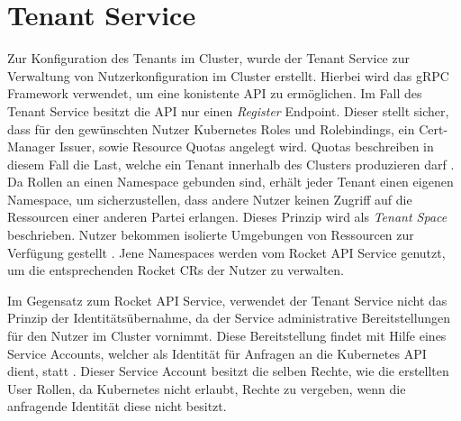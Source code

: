 \section{Tenant Service}
\label{sec:komponenten:tenant-service}
Zur Konfiguration des Tenants im Cluster, wurde der Tenant Service zur Verwaltung von Nutzerkonfiguration im Cluster erstellt.
Hierbei wird das gRPC Framework verwendet, um eine konistente API zu ermöglichen. Im Fall des Tenant Service
besitzt die API nur einen \emph{Register} Endpoint. Dieser stellt sicher, dass für den gewünschten Nutzer 
Kubernetes Roles und Rolebindings, ein Cert-Manager Issuer, sowie Resource Quotas angelegt wird. 
Quotas beschreiben in diesem Fall die Last, welche ein Tenant innerhalb des Clusters produzieren darf \cite{Krebs2012}.
Da Rollen an einen Namespace gebunden sind, erhält jeder Tenant einen eigenen Namespace, um sicherzustellen,
dass andere Nutzer keinen Zugriff auf die Ressourcen einer anderen Partei erlangen.
Dieses Prinzip wird als \emph{Tenant Space} beschrieben. 
Nutzer bekommen isolierte Umgebungen von Ressourcen zur Verfügung gestellt \cite{Krebs2012}.
Jene Namespaces werden vom Rocket API Service genutzt, um die entsprechenden Rocket \acp{CR} der Nutzer zu verwalten. 

Im Gegensatz zum Rocket API Service, verwendet der Tenant Service nicht das Prinzip der Identitätsübernahme, da
der Service administrative Bereitstellungen für den Nutzer im Cluster vornimmt. 
Diese Bereitstellung findet mit Hilfe eines Service Accounts, welcher als Identität für Anfragen 
an die Kubernetes API dient, statt . Dieser Service Account besitzt die selben Rechte,
wie die erstellten User Rollen, da Kubernetes nicht erlaubt, Rechte zu vergeben, wenn die anfragende Identität
diese nicht besitzt.

